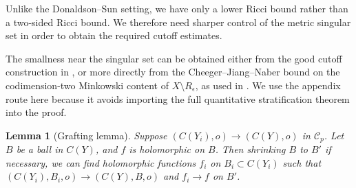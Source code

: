 \documentclass[11pt]{amsart}
\newtheorem{lemma}[theorem]{Lemma}
\theoremstyle{definition}
\theoremstyle{remark}
\begin{document}
Unlike the Donaldson--Sun setting, we have only a lower Ricci bound rather than
a two-sided Ricci bound. We therefore need sharper control of the metric
singular set in order to obtain the required cutoff estimates.

The smallness near the singular set can be obtained either from the good cutoff
construction in \cite[Appendix, Proposition 5.1]{SLI}, or more directly
from the Cheeger--Jiang--Naber bound on the codimension-two Minkowski content
of $X\setminus R_\epsilon$, as used in \cite[Section 3]{SLI}. We use the
appendix route here because it avoids importing the full quantitative
stratification theorem into the proof.

\begin{lemma}[Grafting lemma]
Suppose $(C(Y_i),o)\rightarrow (C(Y),o)$ in $\mathcal C_p$. Let $B$ be a ball in $C(Y)$, and $f$ is holomorphic on $B$. Then shrinking $B$ to $B'$ if necessary, we can find holomorphic functions $f_i$ on $B_i\subset C(Y_i)$ such that $(C(Y_i),B_i,o)\rightarrow (C(Y),B,o)$ and $f_i\rightarrow f$ on $B'$.
\end{lemma}
\end{document}
